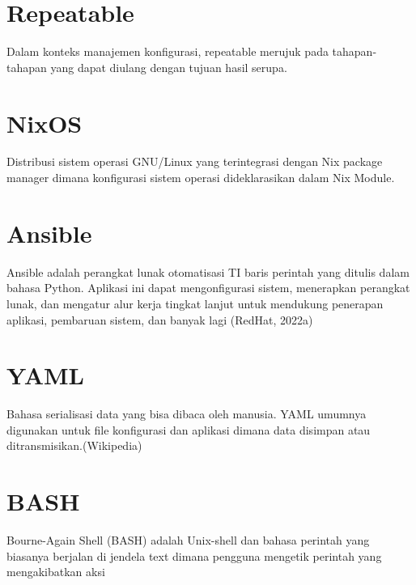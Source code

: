 \documentclass[10pt,]{report}
\begin{document}
\section{Repeatable}
\begin{adjustwidth}{7mm}{}
	\vspace{-3mm}
	Dalam konteks manajemen konfigurasi, repeatable merujuk pada tahapan-tahapan
	yang dapat diulang dengan tujuan hasil serupa.
\end{adjustwidth}
\section{NixOS}
\begin{adjustwidth}{7mm}{}
	\vspace{-3mm}
	Distribusi sistem operasi GNU/Linux yang terintegrasi dengan Nix package
	manager dimana konfigurasi sistem operasi dideklarasikan dalam Nix Module.
\end{adjustwidth}
\section{Ansible}
\begin{adjustwidth}{7mm}{}
	\vspace{-3mm}
	Ansible adalah perangkat lunak otomatisasi TI baris perintah yang ditulis dalam
	bahasa Python. Aplikasi ini dapat mengonfigurasi sistem, menerapkan perangkat
	lunak, dan mengatur alur kerja tingkat lanjut untuk mendukung penerapan
	aplikasi, pembaruan sistem, dan banyak lagi (RedHat, 2022a)
\end{adjustwidth}
\section{YAML}
\begin{adjustwidth}{7mm}{}
	\vspace{-3mm}
	Bahasa serialisasi data yang bisa dibaca oleh manusia. YAML umumnya digunakan
	untuk file konfigurasi dan aplikasi dimana data disimpan atau
	ditransmisikan.(Wikipedia)
\end{adjustwidth}
\section{BASH}
\begin{adjustwidth}{7mm}{}
	\vspace{-3mm}
	Bourne-Again Shell (BASH) adalah Unix-shell dan bahasa perintah yang biasanya
	berjalan di jendela text dimana pengguna mengetik perintah yang mengakibatkan
	aksi
\end{adjustwidth}
\end{document}
